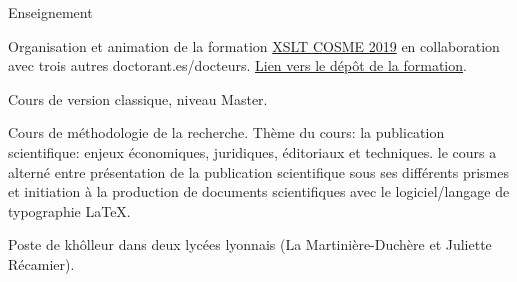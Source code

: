 










\begin{rubric}{Enseignement}
                                \entry*[2018-2019]
                                
                            Organisation et animation de la formation \href{https://cosme.hypotheses.org/1117}{XSLT COSME 2019} en collaboration
                avec trois autres doctorant.es/docteurs. \href{https://github.com/gabays/Cours\_COSME\_2019}{Lien vers le dépôt de la
                formation}.
                    
                                \entry*
                            Cours de version classique,
                niveau Master.
                    
                                \entry*
                            Cours de
                méthodologie de la recherche. Thème du cours: la publication scientifique: enjeux
                économiques, juridiques, éditoriaux et techniques. le cours a alterné entre
                présentation de la publication scientifique sous ses différents prismes et
                initiation à la production de documents scientifiques avec le logiciel/langage de
                typographie LaTeX.
                    
                                \entry*[2017-2018]
                                
                            Poste de khôlleur dans deux lycées lyonnais (La Martinière-Duchère et
                        Juliette Récamier).
                    \end{rubric}


